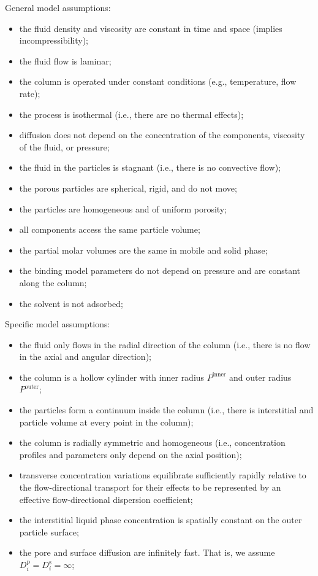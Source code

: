 \documentclass{article}
\begin{document}
General model assumptions:
\begin{itemize}
    \item the fluid density and viscosity are constant in time and space (implies incompressibility);
    \item the fluid flow is laminar;
    \item the column is operated under constant conditions (e.g., temperature, flow rate);
    \item the process is isothermal (i.e., there are no thermal effects);
    \item diffusion does not depend on the concentration of the components, viscosity of the fluid, or pressure;
    \item the fluid in the particles is stagnant (i.e., there is no convective flow);
    \item the porous particles are spherical, rigid, and do not move;
    \item the particles are homogeneous and of uniform porosity;
    \item all components access the same particle volume;
    \item the partial molar volumes are the same in mobile and solid phase;
    \item the binding model parameters do not depend on pressure and are constant along the column;
    \item the solvent is not adsorbed;
\end{itemize}

Specific model assumptions:
\begin{itemize}
    \item the fluid only flows in the radial direction of the column (i.e., there is no flow in the axial and angular direction);
    \item the column is a hollow cylinder with inner radius $P^{\mathrm{inner}}$ and outer radius $P^{\mathrm{outer}}$;
    \item the particles form a continuum inside the column (i.e., there is interstitial and particle volume at every point in the column);
    \item the column is radially symmetric and homogeneous (i.e., concentration profiles and parameters only depend on the axial position);
    \item transverse concentration variations equilibrate sufficiently rapidly relative to the flow-directional transport for their effects to be represented by an effective flow-directional dispersion coefficient;
    \item the interstitial liquid phase concentration is spatially constant on the outer particle surface;
    \item the pore and surface diffusion are infinitely fast. That is, we assume $D^{\mathrm{p}}_{i} = D^{\mathrm{s}}_{i} = \infty$;
\end{itemize}
\end{document}
